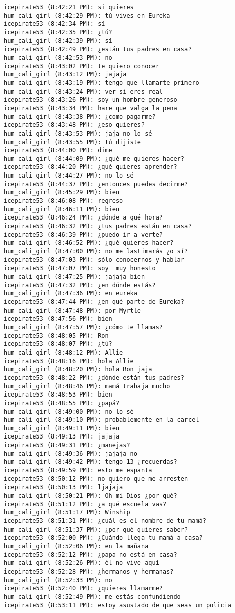 \begin{verbatim}
icepirate53 (8:42:21 PM): si quieres
hum_cali_girl (8:42:29 PM): tú vives en Eureka
icepirate53 (8:42:34 PM): sí
icepirate53 (8:42:35 PM): ¿tú?
hum_cali_girl (8:42:39 PM): sí
icepirate53 (8:42:49 PM): ¿están tus padres en casa?
hum_cali_girl (8:42:53 PM): no
icepirate53 (8:43:02 PM): te quiero conocer
hum_cali_girl (8:43:12 PM): jajaja
hum_cali_girl (8:43:19 PM): tengo que llamarte primero
hum_cali_girl (8:43:24 PM): ver si eres real
icepirate53 (8:43:26 PM): soy un hombre generoso
icepirate53 (8:43:34 PM): hare que valga la pena
hum_cali_girl (8:43:38 PM): ¿como pagarme?
icepirate53 (8:43:48 PM): ¿eso quieres?
hum_cali_girl (8:43:53 PM): jaja no lo sé
hum_cali_girl (8:43:55 PM): tú dijiste
icepirate53 (8:44:00 PM): dime
hum_cali_girl (8:44:09 PM): ¿qué me quieres hacer?
icepirate53 (8:44:20 PM): ¿qué quieres aprender?
hum_cali_girl (8:44:27 PM): no lo sé
icepirate53 (8:44:37 PM): ¿entonces puedes decirme?
hum_cali_girl (8:45:29 PM): bien
icepirate53 (8:46:08 PM): regreso
hum_cali_girl (8:46:11 PM): bien
icepirate53 (8:46:24 PM): ¿dónde a qué hora?
icepirate53 (8:46:32 PM): ¿tus padres están en casa?
icepirate53 (8:46:39 PM): ¿puedo ir a verte?
hum_cali_girl (8:46:52 PM): ¿qué quieres hacer?
hum_cali_girl (8:47:00 PM): no me lastimarás ¿o sí?
icepirate53 (8:47:03 PM): sólo conocernos y hablar
icepirate53 (8:47:07 PM): soy  muy honesto
hum_cali_girl (8:47:25 PM): jajaja bien
icepirate53 (8:47:32 PM): ¿en dónde estás?
hum_cali_girl (8:47:36 PM): en eureka
icepirate53 (8:47:44 PM): ¿en qué parte de Eureka?
hum_cali_girl (8:47:48 PM): por Myrtle
icepirate53 (8:47:56 PM): bien
hum_cali_girl (8:47:57 PM): ¿cómo te llamas?
icepirate53 (8:48:05 PM): Ron
icepirate53 (8:48:07 PM): ¿tú?
hum_cali_girl (8:48:12 PM): Allie
icepirate53 (8:48:16 PM): hola Allie
hum_cali_girl (8:48:20 PM): hola Ron jaja
icepirate53 (8:48:22 PM): ¿dónde están tus padres? 
hum_cali_girl (8:48:46 PM): mamá trabaja mucho
icepirate53 (8:48:53 PM): bien
icepirate53 (8:48:55 PM): ¿papá?
hum_cali_girl (8:49:00 PM): no lo sé
hum_cali_girl (8:49:10 PM): probablemente en la carcel
hum_cali_girl (8:49:11 PM): bien
icepirate53 (8:49:13 PM): jajaja 
icepirate53 (8:49:31 PM): ¿manejas?
hum_cali_girl (8:49:36 PM): jajaja no
hum_cali_girl (8:49:42 PM): tengo 13 ¿recuerdas?
icepirate53 (8:49:59 PM): esto me espanta 
icepirate53 (8:50:12 PM): no quiero que me arresten
icepirate53 (8:50:13 PM): ljajaja
hum_cali_girl (8:50:21 PM): Oh mi Dios ¿por qué?
icepirate53 (8:51:12 PM): ¿a qué escuela vas?
hum_cali_girl (8:51:17 PM): Winship
icepirate53 (8:51:31 PM): ¿cuál es el nombre de tu mamá?
hum_cali_girl (8:51:37 PM): ¿por qué quieres saber?
icepirate53 (8:52:00 PM): ¿Cuándo llega tu mamá a casa?
hum_cali_girl (8:52:06 PM): en la mañana
icepirate53 (8:52:12 PM): ¿papa no está en casa?
hum_cali_girl (8:52:26 PM): él no vive aquí
icepirate53 (8:52:28 PM): ¿hermanos y hermanas?
hum_cali_girl (8:52:33 PM): no
icepirate53 (8:52:40 PM): ¿quieres llamarme?
hum_cali_girl (8:52:49 PM): me estás confundiendo
icepirate53 (8:53:11 PM): estoy asustado de que seas un policia
\end{verbatim}